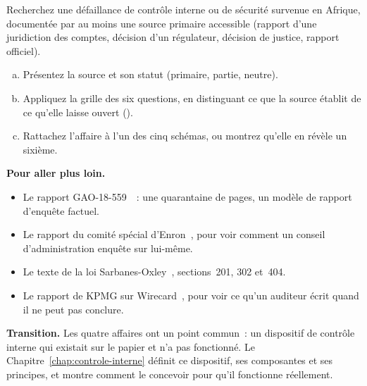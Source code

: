\begin{boxexo}[title={\ding{45}\quad Exercice~2.10. Une affaire africaine \niveauexpert}]
Recherchez une défaillance de contrôle interne ou de sécurité survenue en
Afrique, documentée par au moins une source primaire accessible (rapport
d'une juridiction des comptes, décision d'un régulateur, décision de
justice, rapport officiel).
\begin{enumerate}[(a)]
    \item Présentez la source et son statut (primaire, partie, neutre).
    \item Appliquez la grille des six questions, en distinguant ce que la
          source établit de ce qu'elle laisse ouvert (\NEK{}).
    \item Rattachez l'affaire à l'un des cinq schémas, ou montrez qu'elle en
          révèle un sixième.
\end{enumerate}
\end{boxexo}

\bigskip

\begin{boxinfo}
\textbf{Pour aller plus loin.}
\begin{itemize}
    \item Le rapport GAO-18-559~\cite{gao2018equifax}~: une quarantaine de
          pages, un modèle de rapport d'enquête factuel.
    \item Le rapport du comité spécial d'Enron~\cite{powers2002enron}, pour
          voir comment un conseil d'administration enquête sur lui-même.
    \item Le texte de la loi Sarbanes-Oxley~\cite{sox2002}, sections~201,
          302 et~404.
    \item Le rapport de KPMG sur Wirecard~\cite{wirecard2020kpmg}, pour voir
          ce qu'un auditeur écrit quand il ne peut pas conclure.
\end{itemize}
\end{boxinfo}

\begin{boxinfo}
\textbf{Transition.} Les quatre affaires ont un point commun~: un
dispositif de contrôle interne qui existait sur le papier et n'a pas
fonctionné. Le Chapitre~\ref{chap:controle-interne} définit ce dispositif,
ses composantes et ses principes, et montre comment le concevoir pour qu'il
fonctionne réellement.
\end{boxinfo}
